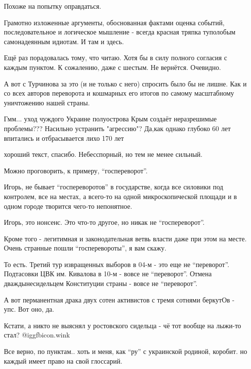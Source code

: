 \begin{itemize}
Похоже на попытку оправдаться.


Грамотно изложенные аргументы, обоснованная фактами оценка событий,
последовательное и логическое мышление - всегда красная тряпка туполобым
самонадеянным идиотам. И там и здесь.

Ещё раз порадовалась тому, что читаю. Хотя бы в силу полного согласия с каждым пунктом.
К сожалению, даже с шестым. Не вернётся. Очевидно.

А вот с Турчинова за это (и не только с него) спросить было бы не лишне. Как и
со всех авторов переворота и кошмарных его итогов по самому масштабному
уничтожению нашей страны.

Гмм... уход чуждого Украине полуострова Крым создаёт неразрешимые проблемы???
Насильно устранить  "агрессию"?
Да,как однако глубоко 60 лет впитались и отбрасывается лихо 170 лет


хороший текст, спасибо. Небесспорный, но тем не менее сильный.

Можно проговорить, к примеру, \enquote{госпереворот}.

Игорь, не бывает \enquote{госпереворотов} в государстве, когда все силовики под
контролем, все на местах, а всего-то на одной микроскопической площади и в
одном городе творится чего-то непонятное.

Игорь, это нонсенс. Это что-то другое, но никак не \enquote{госпереворот}.

Кроме того - легитимная и законодательная ветвь власти даже при этом на месте.
Очень странные пошли \enquote{госперевороты}, я вам скажу.

То есть. Третий тур извращенных выборов в 04-м - это еще не \enquote{переворот}.
Подтасовки ЦВК им. Кивалова в 10-м - вовсе не \enquote{переворот}. Отмена
дваждынесидельцем Конституции страны - вовсе не \enquote{переворот}.

А вот перманентная драка двух сотен активистов с тремя сотнями беркутОв - упс. Вот оно, да.

Кстати, а никто не выяснял у ростовского сидельца - чё тот вообще на лыжи-то
стал?  @igg{fbicon.wink} 


Все верно, по пунктам.. хоть и меня, как \enquote{ру} с украинской родиной, коробит. но
каждый имеет право на свой глоссарий.

\end{itemize} %
